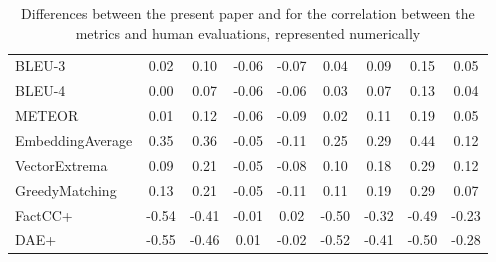 \begin{table}
{\begin{tabular}{l|cc|cc|cc|cc}
BLEU-3           & 0.02  & 0.10                   & -0.06 & -0.07                    & 0.04  & 0.09                 & 0.15  & 0.05                   \\
BLEU-4           & 0.00  & 0.07                   & -0.06 & -0.06                    & 0.03  & 0.07                 & 0.13  & 0.04                   \\
METEOR           & 0.01  & 0.12                   & -0.06 & -0.09                    & 0.02  & 0.11                 & 0.19  & 0.05                   \\
EmbeddingAverage & 0.35  & 0.36                   & -0.05 & -0.11                    & 0.25  & 0.29                 & 0.44  & 0.12                   \\
VectorExtrema    & 0.09  & 0.21                   & -0.05 & -0.08                    & 0.10  & 0.18                 & 0.29  & 0.12                   \\
GreedyMatching   & 0.13  & 0.21                   & -0.05 & -0.11                    & 0.11  & 0.19                 & 0.29  & 0.07                   \\
FactCC+          & -0.54 & -0.41                  & -0.01 & 0.02                     & -0.50 & -0.32                & -0.49 & -0.23                  \\
DAE+             & -0.55 & -0.46                  & 0.01  & -0.02                    & -0.52 & -0.41                & -0.50 & -0.28                  \\
\hline
\end{tabular}

}\caption{Differences between the present paper and \citet{gao2022dialsummeval} for the correlation between the metrics and human evaluations, represented numerically}
\end{table}



